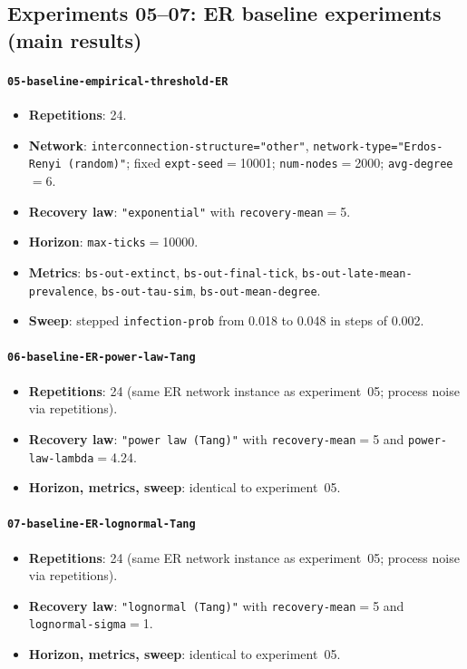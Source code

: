 \documentclass[11pt,a4paper]{article}
\begin{document}
\subsection{Experiments 05--07: ER baseline experiments (main results)}
\paragraph{\texttt{05-baseline-empirical-threshold-ER}}
\begin{itemize}[leftmargin=*]
  \item \textbf{Repetitions}: 24.
  \item \textbf{Network}: \texttt{interconnection-structure="other"}, \texttt{network-type="Erdos-Renyi (random)"}; fixed \texttt{expt-seed}$=$10001; \texttt{num-nodes}$=$2000; \texttt{avg-degree}$=$6.
  \item \textbf{Recovery law}: \texttt{"exponential"} with \texttt{recovery-mean}$=$5.
  \item \textbf{Horizon}: \texttt{max-ticks}$=$10000.
  \item \textbf{Metrics}: \texttt{bs-out-extinct}, \texttt{bs-out-final-tick}, \texttt{bs-out-late-mean-prevalence}, \texttt{bs-out-tau-sim}, \texttt{bs-out-mean-degree}.
  \item \textbf{Sweep}: stepped \texttt{infection-prob} from 0.018 to 0.048 in steps of 0.002.
\end{itemize}

\paragraph{\texttt{06-baseline-ER-power-law-Tang}}
\begin{itemize}[leftmargin=*]
  \item \textbf{Repetitions}: 24 (same ER network instance as experiment~05; process noise via repetitions).
  \item \textbf{Recovery law}: \texttt{"power law (Tang)"} with \texttt{recovery-mean}$=$5 and \texttt{power-law-lambda}$=$4.24.
  \item \textbf{Horizon, metrics, sweep}: identical to experiment~05.
\end{itemize}

\paragraph{\texttt{07-baseline-ER-lognormal-Tang}}
\begin{itemize}[leftmargin=*]
  \item \textbf{Repetitions}: 24 (same ER network instance as experiment~05; process noise via repetitions).
  \item \textbf{Recovery law}: \texttt{"lognormal (Tang)"} with \texttt{recovery-mean}$=$5 and \texttt{lognormal-sigma}$=$1.
  \item \textbf{Horizon, metrics, sweep}: identical to experiment~05.
\end{itemize}
\end{document}
